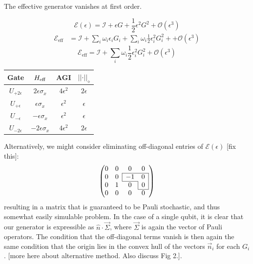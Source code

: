 \documentclass[aps,nofootinbib,pra,notitlepage,twocolumn]{revtex4-1}
\newcommand{\note}[1]{{\color{red}[#1]}}
\newcommand{\error}{\ensuremath{{\mathcal{E}}}}
\begin{document}
The effective generator vanishes at first order.

\begin{equation}
	\error(\epsilon) = \mathcal{I} + \epsilon G + \frac{1}{2}\epsilon^2 G^2 + \mathcal{O}(\epsilon^3)
\end{equation}
\begin{align}
	\error_{\text{eff}} 
		&= \mathcal{I} + \sum_i \omega_i \epsilon_i G_i+ \sum_i \omega_i \frac{1}{2}\epsilon^2_i G_i^2 + + \mathcal{O}(\epsilon^3)
\end{align}
\begin{equation}
	\error_{\text{eff}} = \mathcal{I} + \sum_i \omega_i \frac{1}{2}\epsilon^2_i G_i^2 + \mathcal{O}(\epsilon^3)
\end{equation}

\begin{center}
\begin{tabular}{cccc}
	Gate & $H_{\rm{eff}}$ & AGI & $\vert\vert\cdot\vert\vert_\diamond$ \\
\hline
	$U_{+2\epsilon}$ & $2\epsilon \sigma_x$ & $4\epsilon^2$ & $2\epsilon$\\
	$U_{+\epsilon}$ & $\epsilon \sigma_x$ & $\epsilon^2$ & $\epsilon$ \\
	$U_{-\epsilon}$ & $-\epsilon \sigma_x$ & $\epsilon^2$ & $\epsilon$ \\
	$U_{-2\epsilon}$ & $-2\epsilon \sigma_x$ & $4\epsilon^2$ & $2\epsilon$ 
\end{tabular}
\end{center}

Alternatively, we might consider eliminating off-diagonal entries of $\error(\epsilon)$ \note{fix this}:
\begin{equation}
	\left(\begin{array}{@{}ccccc@{}}
		0 & 0 & 0 & 0 \\ 
  		\cline{3-4}
    	0 & 0 & \multicolumn{1}{|c}{-1} & \multicolumn{1}{c|}{0} \\
    	\cline{3-3}		
		0 & 1 & 0 & \multicolumn{1}{|c|}{0}\\
		\cline{4-4}	
		0 & 0 & 0 & 0
	\end{array} 	
	\right)
\end{equation}
 resulting in a matrix that is guaranteed to be Pauli stochastic, and thus somewhat easily simulable problem. In the case of a single qubit, it is clear that our generator is expressible as $\hat{n}\cdot\vec{\Sigma}$, where $\vec{\Sigma}$ is again the vector of Pauli operators. The condition that the off-diagonal terms vanish is then again the same condition that the origin lies in the convex hull of the vectors $\vec{n}_i$ for each $G_i$.
 \note{more here about alternative method. Also discuss Fig 2.}. 
\end{document}
